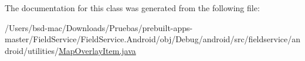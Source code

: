 The documentation for this class was generated from the following file\+:\begin{DoxyCompactItemize}
\item 
/\+Users/bsd-\/mac/\+Downloads/\+Pruebas/prebuilt-\/apps-\/master/\+Field\+Service/\+Field\+Service.\+Android/obj/\+Debug/android/src/fieldservice/android/utilities/\hyperlink{_map_overlay_item_8java}{Map\+Overlay\+Item.\+java}\end{DoxyCompactItemize}
